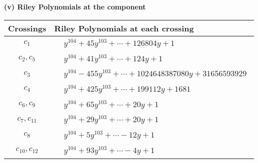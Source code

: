 \documentclass[1p]{elsarticle_modified}
\theoremstyle{definition}
\begin{document}
\newpage\renewcommand{\arraystretch}{1}
\flushleft \textbf{(v) Riley Polynomials at the component}\newline \\
\begin{tabular}{m{50pt}|m{274pt}}
Crossings & \hspace{64pt}Riley Polynomials at each crossing \\
\hline $$\begin{aligned}c_{1}\end{aligned}$$&$\begin{aligned}
&y^{104}+45 y^{103}+\cdots+126804 y+1
\end{aligned}$\\
\hline $$\begin{aligned}c_{2},c_{5}\end{aligned}$$&$\begin{aligned}
&y^{104}+41 y^{103}+\cdots+124 y+1
\end{aligned}$\\
\hline $$\begin{aligned}c_{3}\end{aligned}$$&$\begin{aligned}
&y^{104}-455 y^{103}+\cdots+1024648387080 y+31656593929
\end{aligned}$\\
\hline $$\begin{aligned}c_{4}\end{aligned}$$&$\begin{aligned}
&y^{104}+425 y^{103}+\cdots+199112 y+1681
\end{aligned}$\\
\hline $$\begin{aligned}c_{6},c_{9}\end{aligned}$$&$\begin{aligned}
&y^{104}+65 y^{103}+\cdots+20 y+1
\end{aligned}$\\
\hline $$\begin{aligned}c_{7},c_{11}\end{aligned}$$&$\begin{aligned}
&y^{104}+29 y^{103}+\cdots+20 y+1
\end{aligned}$\\
\hline $$\begin{aligned}c_{8}\end{aligned}$$&$\begin{aligned}
&y^{104}+5 y^{103}+\cdots-12 y+1
\end{aligned}$\\
\hline $$\begin{aligned}c_{10},c_{12}\end{aligned}$$&$\begin{aligned}
&y^{104}+93 y^{103}+\cdots-4 y+1
\end{aligned}$\\
\hline
\end{tabular}\\~\\
\end{document}
